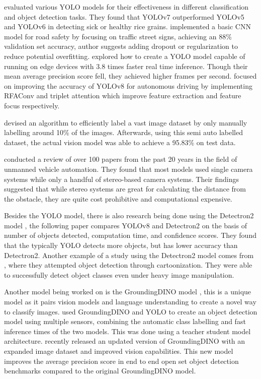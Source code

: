 \documentclass[stu,12pt,floatsintext]{apa7}
\begin{document}
\textcite{quach_evaluating_2023} evaluated various YOLO models for their effectiveness in different classification and object detection tasks. They found that YOLOv7 outperformed YOLOv5 and YOLOv6 in detecting sick or healthy rice grains. \textcite{hindarto_enhancing_2023} implemented a basic CNN model for road safety by focusing on traffic street signs, achieving an 88\% validation set accuracy, author suggests adding dropout or regularization to reduce potential overfitting. \textcite{pedoeem_yolo-lite_2018} explored how to create a YOLO model capable of running on edge devices with 3.8 times faster real time inference. Though their mean average precision score fell, they achieved higher frames per second. \textcite{ling_optimization_2024} focused on improving the accuracy of YOLOv8 for autonomous driving by implementing RFAConv and triplet attention which improve feature extraction and feature focus respectively.

\textcite{hu_novel_2019} devised an algorithm to efficiently label a vast image dataset by only manually labelling around 10\% of the images. Afterwards, using this semi auto labelled dataset, the actual vision model was able to achieve a 95.83\% on test data.

\textcite{badrloo_image-based_2022} conducted a review of over 100 papers from the past 20 years in the field of unmanned vehicle automation. They found that most models used single camera systems while only a handful of stereo-based camera systems. Their findings suggested that while stereo systems are great for calculating the distance from the obstacle, they are quite cost prohibitive and computational expensive.

Besides the YOLO model, there is also research being done using the Detectron2 model \parencite{wu2019detectron2}, the following paper \parencite{wadhwa_comparison_2023} compares YOLOv8 and Detectron2 on the basis of number of objects detected, computation time, and confidence scores. They found that the typically YOLO detects more objects, but has lower accuracy than Detectron2. Another example of a study using the Detectron2 model comes from \textcite{abhishek_detectron2_2021}, where they attempted object detection through cartoonization. They were able to successfully detect object classes even under heavy image manipulation.

Another model being worked on is the GroundingDINO model \parencite{liu_grounding_2024}, this is a unique model as it pairs vision models and language understanding to create a novel way to classify images. \textcite{son_teacherstudent_2024} used GroundingDINO and YOLO to create an object detection model using multiple sensors, combining the automatic class labelling and fast inference times of the two models. This was done using a teacher student model architecture. \textcite{ren_grounding_2024} recently released an updated version of GroundingDINO with an expanded image dataset and improved vision capabilities. This new model improves the average precision score in end to end open set object detection benchmarks compared to the original GroundingDINO model.
\end{document}
